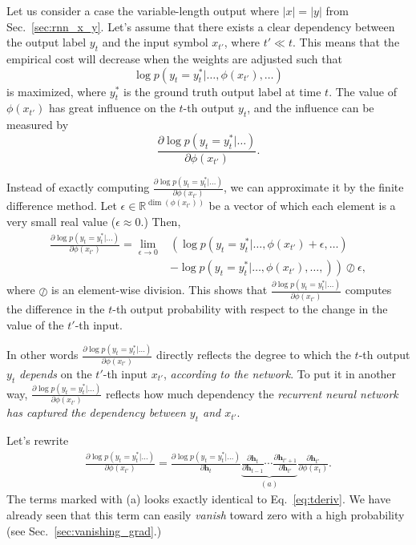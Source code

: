 \documentclass{report}
\newcommand{\vect}[1]{\mathbf{#1}}
\newcommand{\vh}[0]{\vect{h}}
\newcommand{\RR}[0]{\mathbb{R}}
\begin{document}
Let us consider a case the variable-length output where $|x|=|y|$ from
Sec.~\ref{sec:rnn_x_y}. Let's assume that there exists a clear dependency
between the output label $y_t$ and the input symbol $x_{t'}$, where $t' \ll t$.
This means that the empirical cost will decrease when the weights are adjusted
such that 
\[
    \log p(y_t=y_t^*| \ldots, \phi(x_{t'}), \ldots)
\]
is maximized, where $y_t^*$ is the ground truth output label at time $t$. The
value of $\phi(x_{t'})$ has great influence on the $t$-th output $y_t$, and the
influence can be measured by 
\[ 
    \frac{\partial \log p(y_t=y_t^*| \ldots)}{\partial \phi(x_{t'})}.
\]

Instead of exactly computing $\frac{\partial \log p(y_t=y_t^*| \ldots)}{\partial
\phi(x_{t'})}$, we can approximate it by the finite difference method. Let
$\epsilon \in \RR^{\dim(\phi(x_{t'}))}$ be a vector of which each element is a
very small real value ($\epsilon \approx 0$.) Then,
\begin{align*}
    \frac{\partial \log p(y_t=y_t^*|\ldots)}{\partial \phi(x_{t'})} 
    = \lim_{\epsilon \to 0}& \left(\log p(y_t=y_t^*|\ldots,
    \phi(x_{t'})+\epsilon, \ldots)
    \right.
    \\
&- \left. \log p(y_t=y_t^*|\ldots, \phi(x_{t'}), \ldots, )\right) \oslash \epsilon,
\end{align*}
where $\oslash$ is an element-wise division.  This shows that $\frac{\partial
\log p(y_t=y_t^*|\ldots)}{\partial \phi(x_{t'})}$ computes the difference in the
$t$-th output probability with respect to the change in the value of the $t'$-th
input. 

In other words $\frac{\partial \log p(y_t=y_t^*|\ldots)}{\partial \phi(x_{t'})}$
directly reflects the degree to which the $t$-th output $y_t$ {\em depends} on
the $t'$-th input $x_{t'}$, {\em according to the network}.  To put it in
another way, $\frac{\partial \log p(y_t=y_t^*|\ldots)}{\partial\phi(x_{t'})}$
reflects how much dependency the {\em recurrent neural network has captured the
dependency between $y_t$ and $x_{t'}$}.

Let's rewrite 
\begin{align*}
    \frac{\partial \log p(y_t=y_t^*|\ldots)}{\partial \phi(x_{t'})} 
    = \frac{\partial \log p(y_t=y_t^*|\ldots)}{\partial \vh_t}
    \underbrace{
        \frac{\partial \vh_t}{\partial \vh_{t-1}} \cdots
        \frac{\partial \vh_{t'+1}}{\partial \vh_{t'}} 
    }_{(a)}
    \frac{\partial \vh_{t'}}{\partial \phi(x_t)}.
\end{align*}
The terms marked with (a) looks exactly identical to Eq.~\eqref{eq:tderiv}. We
have already seen that this term can easily {\em vanish} toward zero with a high
probability (see Sec.~\ref{sec:vanishing_grad}.)
\end{document}
